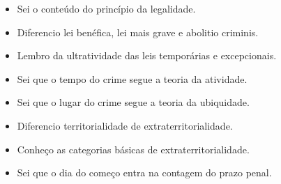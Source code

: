 \documentclass[11pt,a4paper]{article}
\begin{document}
\begin{itemize}
  \item[$\square$] Sei o conteúdo do princípio da legalidade.
  \item[$\square$] Diferencio lei benéfica, lei mais grave e abolitio criminis.
  \item[$\square$] Lembro da ultratividade das leis temporárias e excepcionais.
  \item[$\square$] Sei que o tempo do crime segue a teoria da atividade.
  \item[$\square$] Sei que o lugar do crime segue a teoria da ubiquidade.
  \item[$\square$] Diferencio territorialidade de extraterritorialidade.
  \item[$\square$] Conheço as categorias básicas de extraterritorialidade.
  \item[$\square$] Sei que o dia do começo entra na contagem do prazo penal.
\end{itemize}
\end{document}
